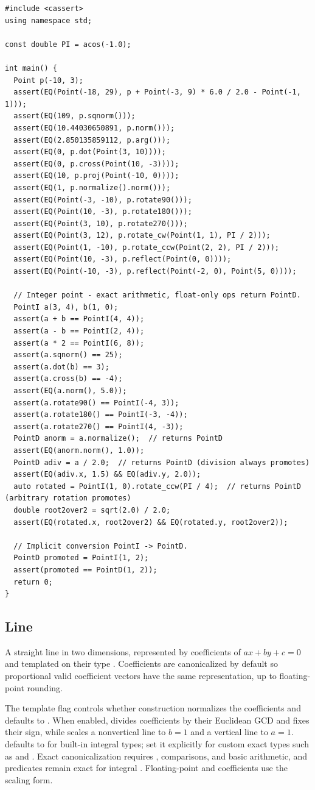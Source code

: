 \begin{lstlisting}[style=cpp]
#include <cassert>
using namespace std;

const double PI = acos(-1.0);

int main() {
  Point p(-10, 3);
  assert(EQ(Point(-18, 29), p + Point(-3, 9) * 6.0 / 2.0 - Point(-1, 1)));
  assert(EQ(109, p.sqnorm()));
  assert(EQ(10.44030650891, p.norm()));
  assert(EQ(2.850135859112, p.arg()));
  assert(EQ(0, p.dot(Point(3, 10))));
  assert(EQ(0, p.cross(Point(10, -3))));
  assert(EQ(10, p.proj(Point(-10, 0))));
  assert(EQ(1, p.normalize().norm()));
  assert(EQ(Point(-3, -10), p.rotate90()));
  assert(EQ(Point(10, -3), p.rotate180()));
  assert(EQ(Point(3, 10), p.rotate270()));
  assert(EQ(Point(3, 12), p.rotate_cw(Point(1, 1), PI / 2)));
  assert(EQ(Point(1, -10), p.rotate_ccw(Point(2, 2), PI / 2)));
  assert(EQ(Point(10, -3), p.reflect(Point(0, 0))));
  assert(EQ(Point(-10, -3), p.reflect(Point(-2, 0), Point(5, 0))));

  // Integer point - exact arithmetic, float-only ops return PointD.
  PointI a(3, 4), b(1, 0);
  assert(a + b == PointI(4, 4));
  assert(a - b == PointI(2, 4));
  assert(a * 2 == PointI(6, 8));
  assert(a.sqnorm() == 25);
  assert(a.dot(b) == 3);
  assert(a.cross(b) == -4);
  assert(EQ(a.norm(), 5.0));
  assert(a.rotate90() == PointI(-4, 3));
  assert(a.rotate180() == PointI(-3, -4));
  assert(a.rotate270() == PointI(4, -3));
  PointD anorm = a.normalize();  // returns PointD
  assert(EQ(anorm.norm(), 1.0));
  PointD adiv = a / 2.0;  // returns PointD (division always promotes)
  assert(EQ(adiv.x, 1.5) && EQ(adiv.y, 2.0));
  auto rotated = PointI(1, 0).rotate_ccw(PI / 4);  // returns PointD (arbitrary rotation promotes)
  double root2over2 = sqrt(2.0) / 2.0;
  assert(EQ(rotated.x, root2over2) && EQ(rotated.y, root2over2));

  // Implicit conversion PointI -> PointD.
  PointD promoted = PointI(1, 2);
  assert(promoted == PointD(1, 2));
  return 0;
}
\end{lstlisting}
\subsection{Line}
\label{sec:7.1.2}
A straight line in two dimensions, represented by coefficients of $ax + by + c = 0$ and templated on their type . Coefficients are canonicalized by default so proportional valid coefficient vectors have the same representation, up to floating-point rounding.

The template flag  controls whether construction normalizes the coefficients and defaults to . When enabled,  divides coefficients by their Euclidean GCD and fixes their sign, while  scales a nonvertical line to $b = 1$ and a vertical line to $a = 1$.  defaults to  for built-in integral types; set it explicitly for custom exact types such as  and . Exact canonicalization requires \inlinecode{\%}, comparisons, and basic arithmetic, and predicates remain exact for integral . Floating-point and  coefficients use the scaling form.

